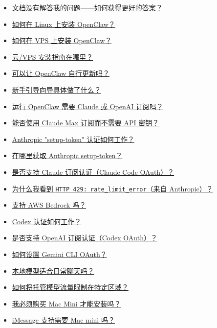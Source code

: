 \begin{itemize}
  \item \href{\#the-docs-didnt-answer-my-question-how-do-i-get-a-better-answer}{文档没有解答我的问题——如何获得更好的答案？}
  \item \href{\#how-do-i-install-openclaw-on-linux}{如何在 Linux 上安装 OpenClaw？}
  \item \href{\#how-do-i-install-openclaw-on-a-vps}{如何在 VPS 上安装 OpenClaw？}
  \item \href{\#where-are-the-cloudvps-install-guides}{云/VPS 安装指南在哪里？}
  \item \href{\#can-i-ask-openclaw-to-update-itself}{可以让 OpenClaw 自行更新吗？}
  \item \href{\#what-does-the-onboarding-wizard-actually-do}{新手引导向导具体做了什么？}
  \item \href{\#do-i-need-a-claude-or-openai-subscription-to-run-this}{运行 OpenClaw 需要 Claude 或 OpenAI 订阅吗？}
  \item \href{\#can-i-use-claude-max-subscription-without-an-api-key}{能否使用 Claude Max 订阅而不需要 API 密钥？}
  \item \href{\#how-does-anthropic-setuptoken-auth-work}{Anthropic "setup-token" 认证如何工作？}
  \item \href{\#where-do-i-find-an-anthropic-setuptoken}{在哪里获取 Anthropic setup-token？}
  \item \href{\#do-you-support-claude-subscription-auth-claude-code-oauth}{是否支持 Claude 订阅认证（Claude Code OAuth）？}
  \item \href{\#why-am-i-seeing-http-429-ratelimiterror-from-anthropic}{为什么我看到 \texttt{HTTP 429: rate\_limit\_error}（来自 Anthropic）？}
  \item \href{\#is-aws-bedrock-supported}{支持 AWS Bedrock 吗？}
  \item \href{\#how-does-codex-auth-work}{Codex 认证如何工作？}
  \item \href{\#do-you-support-openai-subscription-auth-codex-oauth}{是否支持 OpenAI 订阅认证（Codex OAuth）？}
  \item \href{\#how-do-i-set-up-gemini-cli-oauth}{如何设置 Gemini CLI OAuth？}
  \item \href{\#is-a-local-model-ok-for-casual-chats}{本地模型适合日常聊天吗？}
  \item \href{\#how-do-i-keep-hosted-model-traffic-in-a-specific-region}{如何将托管模型流量限制在特定区域？}
  \item \href{\#do-i-have-to-buy-a-mac-mini-to-install-this}{我必须购买 Mac Mini 才能安装吗？}
  \item \href{\#do-i-need-a-mac-mini-for-imessage-support}{iMessage 支持需要 Mac mini 吗？}

\end{itemize}
